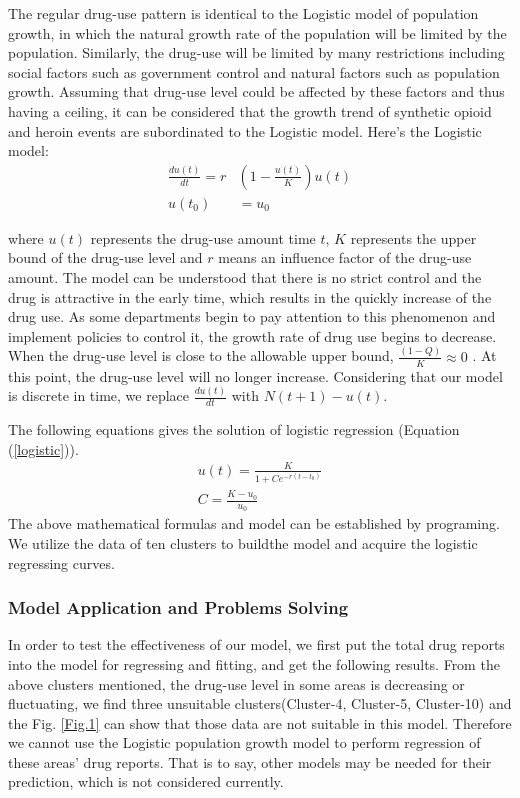 \documentclass[12pt]{article}
\begin{document}
The regular drug-use pattern is identical to the Logistic model of population growth, in which the natural growth rate of the population will be limited by the population. Similarly, the drug-use will be limited by many restrictions including social factors such as government control and natural factors such as population growth. Assuming that drug-use level could be affected by these factors and thus having a ceiling, it can be considered that the growth trend of synthetic opioid and heroin events are subordinated to the Logistic model. Here’s the Logistic model:
\begin{equation}
	\begin{split}
	\frac{du(t)}{dt} = r&(1-\frac{u(t)}{K})u(t) \label{logistic}\\
	u(t_{0}) &= u_{0}
	\end{split}
\end{equation}

where $u(t)$ represents the drug-use amount time $t$, $K$ represents the upper bound of the drug-use level and $r$ means an influence factor of the drug-use amount. The model can be understood that there is no strict control and the drug is attractive in the early time, which results in the quickly increase of the drug use. As some departments begin to pay attention to this phenomenon and implement policies to control it, the growth rate of drug use begins to decrease. When the drug-use level is close to the allowable upper bound, $\frac{(1-Q)}{K} \approx 0$ . At this point, the drug-use level will no longer increase. Considering that our model is discrete in time,  we replace $\frac{du(t)}{dt}$ with $N(t+1)-u(t)$.

The following equations gives the solution of logistic regression (Equation (\ref{logistic})).
\begin{gather}
	u(t)=\frac{K}{1+Ce^{-r(t-t_{0})}} \\
	C=\frac{K-u_{0}}{u_{0}} 
\end{gather}
The above mathematical formulas and model can be established by programing. We utilize the data of ten clusters to buildthe model and acquire the logistic regressing curves.

\subsubsection{Model Application and Problems Solving}
In order to test the effectiveness of our model, we first put the total drug reports into the model for regressing and fitting, and get the following results. From the above clusters mentioned, the drug-use level in some areas is decreasing or fluctuating, we find three unsuitable clusters(Cluster-4, Cluster-5, Cluster-10) and the Fig. \ref{Fig.1} can show that those data are not suitable in this model. Therefore we cannot use the Logistic population growth model to perform regression of these areas’ drug reports. That is to say, other models may be needed for their prediction, which is not considered currently.
\end{document}
